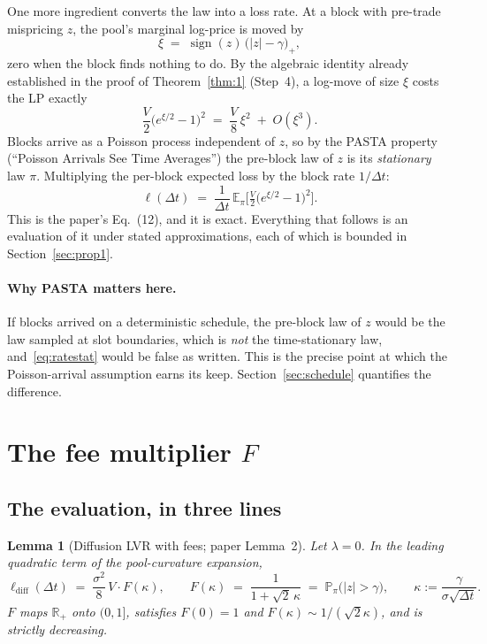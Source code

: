 \documentclass[11pt]{article}
\newtheorem{lemma}{Lemma}
\theoremstyle{definition}
\theoremstyle{remark}
\newcommand{\E}{\mathbb{E}}
\newcommand{\Prob}{\mathbb{P}}
\newcommand{\R}{\mathbb{R}}
\newcommand{\dt}{\Delta t}
\newcommand{\1}{\mathbf{1}}
\DeclareMathOperator{\sgn}{sign}
\begin{document}
One more ingredient converts the law into a loss rate. At a block with pre-trade mispricing $z$, the pool's marginal log-price is moved by
\[
\xi \;=\; \sgn(z)\,\big(|z| - \gamma\big)_+ ,
\]
zero when the block finds nothing to do. By the algebraic identity already established in the proof of Theorem~\ref{thm:1} (Step~4), a log-move of size $\xi$ costs the LP exactly
\begin{equation}\label{eq:perloss}
\frac{V}{2}\big(e^{\xi/2}-1\big)^2 \;=\; \frac{V}{8}\,\xi^2 \;+\; O(\xi^3).
\end{equation}
Blocks arrive as a Poisson process independent of $z$, so by the PASTA property (``Poisson Arrivals See Time Averages'') the pre-block law of $z$ is its \emph{stationary} law $\pi$. Multiplying the per-block expected loss by the block rate $1/\dt$:
\begin{equation}\label{eq:ratestat}
\boxed{\;\ell(\dt) \;=\; \frac{1}{\dt}\,\E_\pi\!\Big[\tfrac{V}{2}\big(e^{\xi/2}-1\big)^2\Big]. \;}
\end{equation}
This is the paper's Eq.~(12), and it is exact. Everything that follows is an evaluation of it under stated approximations, each of which is bounded in Section~\ref{sec:prop1}.

\paragraph{Why PASTA matters here.} If blocks arrived on a deterministic schedule, the pre-block law of $z$ would be the law sampled at slot boundaries, which is \emph{not} the time-stationary law, and~\eqref{eq:ratestat} would be false as written. This is the precise point at which the Poisson-arrival assumption earns its keep. Section~\ref{sec:schedule} quantifies the difference.

\section{The fee multiplier \texorpdfstring{$F$}{F}}\label{sec:F}

\subsection{The evaluation, in three lines}

\begin{lemma}[Diffusion LVR with fees; paper Lemma~2]\label{lem:F}
Let $\lambda = 0$. In the leading quadratic term of the pool-curvature expansion,
\[
\ell_{\mathrm{diff}}(\dt) \;=\; \frac{\sigma^2}{8}\,V\cdot F(\kappa),
\qquad
F(\kappa) \;=\; \frac{1}{1+\sqrt2\,\kappa} \;=\; \Prob_\pi\big(|z|>\gamma\big),
\qquad \kappa := \frac{\gamma}{\sigma\sqrt{\dt}} .
\]
$F$ maps $\R_+$ onto $(0,1]$, satisfies $F(0)=1$ and $F(\kappa)\sim 1/(\sqrt2\kappa)$, and is strictly decreasing.
\end{lemma}
\end{document}
